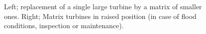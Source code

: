 \begin{figure}[h!]
\begin{minipage}[b]{0.5\linewidth}
 \centering
\end{minipage}
\begin{minipage}[b]{0.5\linewidth}
 \centering
\end{minipage}
\caption{Left; replacement of a single large turbine by a matrix of smaller ones. Right; Matrix turbines in raised position (in case of flood conditions, inspection or maintenance).}
\label{Matrix_a}
\end{figure}

